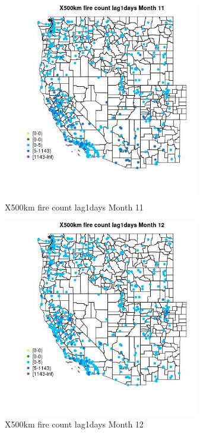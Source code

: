 \begin{figure} 
\centering  
\includegraphics[width=0.77\textwidth]{Code_Outputs/Report_ML_input_PM25_Step4_part_e_de_duplicated_aves_compiled_2019-05-14wNAs_MapObsMo11X500km_fire_count_lag1days.jpg} 
\caption{\label{fig:Report_ML_input_PM25_Step4_part_e_de_duplicated_aves_compiled_2019-05-14wNAsMapObsMo11X500km_fire_count_lag1days}X500km fire count lag1days Month 11} 
\end{figure} 
 

\clearpage 

\begin{figure} 
\centering  
\includegraphics[width=0.77\textwidth]{Code_Outputs/Report_ML_input_PM25_Step4_part_e_de_duplicated_aves_compiled_2019-05-14wNAs_MapObsMo12X500km_fire_count_lag1days.jpg} 
\caption{\label{fig:Report_ML_input_PM25_Step4_part_e_de_duplicated_aves_compiled_2019-05-14wNAsMapObsMo12X500km_fire_count_lag1days}X500km fire count lag1days Month 12} 
\end{figure} 
 


